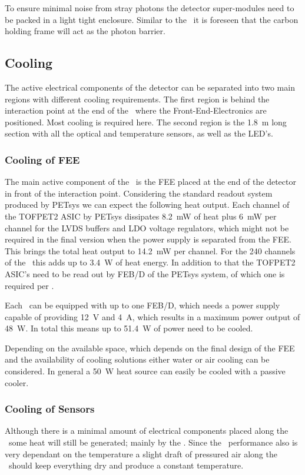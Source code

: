 \documentclass[../BTOF_summary.tex]{subfiles}
\begin{document}
To ensure minimal noise from stray photons the detector super-modules need to be packed in a light tight enclosure.
Similar to the \bdirc\ it is foreseen that the carbon holding frame will act as the photon barrier.

\subsection{Cooling}

The active electrical components of the detector can be separated into two main regions with different cooling requirements.
The first region is behind the interaction point at the end of the \sm\ where the Front-End-Electronics are positioned.
Most cooling is required here.
The second region is the \SI{1.8}{m} long section with all the optical and temperature sensors, as well as the LED's.

\subsubsection*{Cooling of FEE}

The main active component of the \btofD\ is the FEE placed at the end of the detector in front of the interaction point.
%
Considering the standard readout system produced by PETsys we can expect the following heat output.
Each channel of the TOFPET2 ASIC by PETsys dissipates \SI{8.2}{mW} of heat plus \SI{6}{mW} per channel for the LVDS buffers and LDO voltage regulators, which might not be required in the final version when the power supply is separated from the FEE.
This brings the total heat output to \SI{14.2}{mW} per channel.
For the 240 channels of the \sm\ this adds up to \SI{3.4}{W} of heat energy.
In addition to that the TOFPET2 ASIC's need to be read out by FEB/D of the PETsys system, of which one is required per \sm .

Each \sm\ can be equipped with up to one FEB/D, which needs a power supply capable of providing \SI{12}{V} and \SI{4}{A}, which results in a maximum power output of \SI{48}{W}.
In total this means up to \SI{51.4}{W} of power need to be cooled.

Depending on the available space, which depends on the final design of the FEE and the availability of cooling solutions either water or air cooling can be considered.
In general a \SI{50}{W} heat source can easily be cooled with a passive cooler.

\subsubsection*{Cooling of Sensors}

Although there is a minimal amount of electrical components placed along the \railboard\ some heat will still be generated; mainly by the \sipms .
Since the \sipm\ performance also is very dependant on the temperature a slight draft of pressured air along the \railboard\ should keep everything dry and produce a constant temperature.
\end{document}
